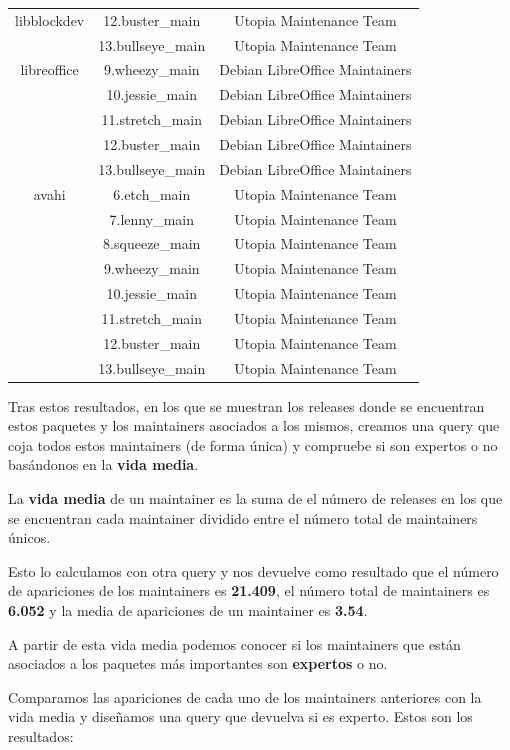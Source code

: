 \documentclass[a4paper, 12pt]{book}
\begin{document}
\begin{longtable}{|c|c|c|}
		\hline
		libblockdev & 12.buster\_main & Utopia Maintenance Team \\
		& 13.bullseye\_main & Utopia Maintenance Team \\
		\hline
		libreoffice & 9.wheezy\_main & Debian LibreOffice Maintainers \\
		& 10.jessie\_main & Debian LibreOffice Maintainers \\
		& 11.stretch\_main & Debian LibreOffice Maintainers \\
		& 12.buster\_main & Debian LibreOffice Maintainers \\
		& 13.bullseye\_main & Debian LibreOffice Maintainers \\
		\hline
		avahi & 6.etch\_main & Utopia Maintenance Team \\
		& 7.lenny\_main & Utopia Maintenance Team \\
		& 8.squeeze\_main & Utopia Maintenance Team \\
		& 9.wheezy\_main & Utopia Maintenance Team \\
		& 10.jessie\_main & Utopia Maintenance Team \\
		& 11.stretch\_main & Utopia Maintenance Team \\
		& 12.buster\_main & Utopia Maintenance Team \\
		& 13.bullseye\_main & Utopia Maintenance Team \\
		\hline
	\end{longtable}


Tras estos resultados, en los que se muestran los releases donde se encuentran estos paquetes y los maintainers asociados a los mismos, creamos una query que coja todos estos maintainers (de forma única) y compruebe si son expertos o no basándonos en la \textbf{vida media}.

La \textbf{vida media} de un maintainer es la suma de el número de releases en los que se encuentran cada maintainer dividido entre el número total de maintainers únicos. 

Esto lo calculamos con otra query y nos devuelve como resultado que el número de apariciones de los maintainers es \textbf{21.409}, el número total de maintainers es \textbf{6.052} y la media de apariciones de un maintainer es \textbf{3.54}.

A partir de esta vida media podemos conocer si los maintainers que están asociados a los paquetes más importantes son \textbf{expertos} o no.

Comparamos las apariciones de cada uno de los maintainers anteriores con la vida media y diseñamos una query que devuelva si es experto. Estos son los resultados:
\end{document}
